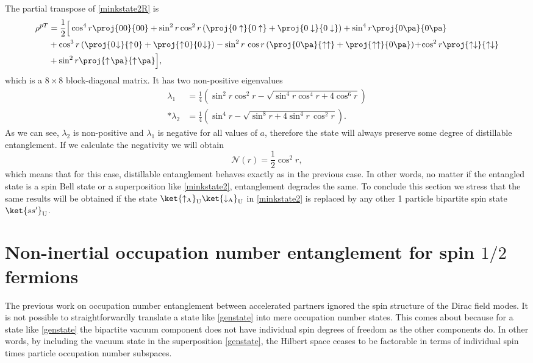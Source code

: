 The partial transpose of \eqref{minkstate2R} is
\begin{align}\label{minkstate2R2}
\nonumber\rho^{pT}&=\frac12\Big[\cos^4r\proj{00}{00}+\sin^2r\cos^2r\left(\proj{0\uparrow}{0\uparrow}+\proj{0\downarrow}{0\downarrow}\right)+\sin^4r\proj{0\pa}{0\pa}\\*
\nonumber&+\cos^3r\left(\proj{0\!\downarrow}{\uparrow\!0}+\proj{\uparrow\!0}{0\!\downarrow}\right)-\sin^2r\,\cos r\left(\proj{0\pa}{\uparrow\uparrow}+\proj{\uparrow\uparrow}{0\pa}\right)\!+\!\cos^2r\proj{\uparrow\downarrow}{\uparrow\downarrow}\\*
&+\sin^2r\proj{\uparrow\!\pa}{\uparrow\!\pa}\Big],
\end{align}
which is a $8\times8$ block-diagonal matrix. It has two non-positive eigenvalues
\begin{align}\label{eig2}
\nonumber\lambda_{1}&=\frac{1}{4}\left(\sin^2r\cos^2r-\sqrt{\sin^4r\cos^4r+4\cos^6r}\right)\\*
\lambda_{2}&=\frac14\left(\sin^4r-\sqrt{\sin^8r+4\sin^4r\,\cos^2r}\right).
\end{align}
As we can see, $\lambda_2$ is non-positive and $\lambda_1$ is negative for all values of $a$, therefore the state will always preserve some degree of distillable entanglement. If we calculate the negativity we will obtain
\begin{equation}
\mathcal{N}(r)=\frac12\cos^2r,
\end{equation}
which means that for this case, distillable entanglement behaves exactly as in the previous case. In other words, no matter if the entangled state is a spin Bell state or a superposition like \eqref{minkstate2}, entanglement degrades the same. To conclude this section we stress that the same results will be obtained if the state $\ket{\uparrow_\text{A}}_\text{U}\ket{\downarrow_\text{A}}_\text{U}$ in \eqref{minkstate2} is replaced by any other 1 particle bipartite spin state $\ket{ss'}_\text{U}$.

\section{Non-inertial occupation number entanglement for spin $1/2$ fermions}\label{sec6}

The previous work \cite{AlsingSchul} on occupation number entanglement between accelerated partners ignored the spin structure of the Dirac field modes. It is not possible to straightforwardly translate a state like \eqref{genstate} into mere occupation number states. This comes about because for a state like \eqref{genstate} the bipartite vacuum component does not have individual spin degrees of freedom as the other components do. In other words, by including the vacuum state in the superposition \eqref{genstate}, the Hilbert space ceases to be factorable in terms of individual spin times particle occupation number subspaces.

